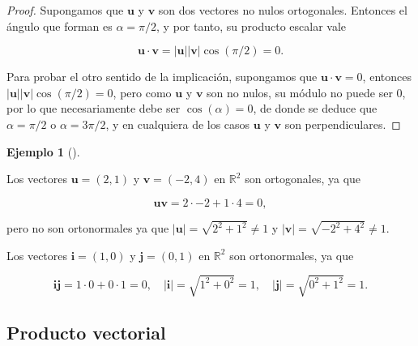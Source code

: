 \documentclass[
  a4paper,
]{scrreport}
\theoremstyle{definition}
\newtheorem{example}{Ejemplo}[chapter]
\theoremstyle{plain}
\theoremstyle{definition}
\theoremstyle{definition}
\theoremstyle{plain}
\theoremstyle{plain}
\theoremstyle{remark}
\begin{document}
\begin{tcolorbox}[enhanced jigsaw, leftrule=.75mm, colbacktitle=quarto-callout-note-color!10!white, toprule=.15mm, opacityback=0, opacitybacktitle=0.6, toptitle=1mm, breakable, bottomtitle=1mm, colframe=quarto-callout-note-color-frame, rightrule=.15mm, titlerule=0mm, title=\textcolor{quarto-callout-note-color}{\faInfo}\hspace{0.5em}{Demostración}, arc=.35mm, left=2mm, bottomrule=.15mm, colback=white, coltitle=black]

\begin{proof}
Supongamos que \(\mathbf{u}\) y \(\mathbf{v}\) son dos vectores no nulos
ortogonales. Entonces el ángulo que forman es \(\alpha = \pi/2\), y por
tanto, su producto escalar vale

\[
\mathbf{u}\cdot\mathbf{v} = |\mathbf{u}||\mathbf{v}|\cos(\pi/2) = 0.
\]

Para probar el otro sentido de la implicación, supongamos que
\(\mathbf{u}\cdot\mathbf{v}=0\), entonces
\(|\mathbf{u}||\mathbf{v}|\cos(\pi/2) = 0\), pero como \(\mathbf{u}\) y
\(\mathbf{v}\) son no nulos, su módulo no puede ser 0, por lo que
necesariamente debe ser \(\cos(\alpha)=0\), de donde se deduce que
\(\alpha=\pi/2\) o \(\alpha=3\pi/2\), y en cualquiera de los casos
\(\mathbf{u}\) y \(\mathbf{v}\) son perpendiculares.
\end{proof}

\end{tcolorbox}

\begin{example}[]\protect\hypertarget{exm-vectores-ortogonales}{}\label{exm-vectores-ortogonales}

Los vectores \(\mathbf{u}=(2,1)\) y \(\mathbf{v}=(-2,4)\) en
\(\mathbb{R}^2\) son ortogonales, ya que

\[
\mathbf{u}\mathbf{v} = 2\cdot -2 +1\cdot 4 = 0,
\]

pero no son ortonormales ya que
\(\lvert\mathbf{u}\rvert = \sqrt{2^2+1^2} \neq 1\) y
\(\lvert \mathbf{v}\rvert = \sqrt{-2^2+4^2} \neq 1\).

Los vectores \(\mathbf{i}=(1,0)\) y \(\mathbf{j}=(0,1)\) en
\(\mathbb{R}^2\) son ortonormales, ya que

\[
\mathbf{i}\mathbf{j} = 1\cdot 0 +0\cdot 1 = 0, \quad \lvert\mathbf{i}\rvert = \sqrt{1^2+0^2} = 1,  \quad \lvert \mathbf j\rvert = \sqrt{0^2+1^2} = 1.
\]

\end{example}

\subsection{Producto vectorial}\label{producto-vectorial}
\end{document}
